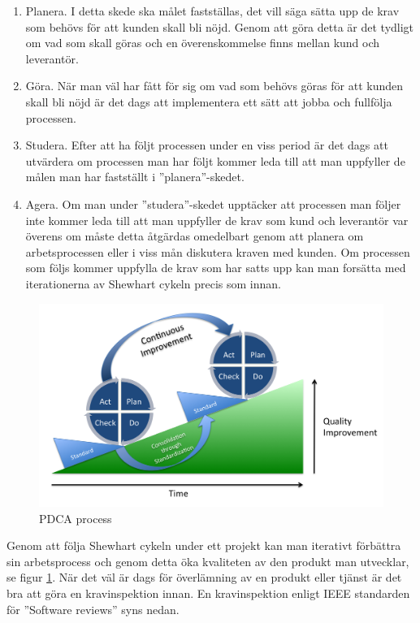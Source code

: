 \begin{enumerate}
  \item Planera. I detta skede ska målet fastställas, det vill säga sätta upp de krav som behövs för att kunden skall bli nöjd. Genom att göra detta är det tydligt om vad som skall göras och en överenskommelse finns mellan kund och leverantör. 
  \item Göra. När man väl har fått för sig om vad som behövs göras för att kunden skall bli nöjd är det dags att implementera ett sätt att jobba och fullfölja processen.
  \item Studera. Efter att ha följt processen under en viss period är det dags att utvärdera om processen man har följt kommer leda till att man uppfyller de målen man har fastställt i ''planera''-skedet.
  \item Agera. Om man under ''studera''-skedet upptäcker att processen man följer inte kommer leda till att man uppfyller de krav som kund och leverantör var överens om måste detta åtgärdas omedelbart genom att planera om arbetsprocessen eller i viss mån diskutera kraven med kunden. Om processen som följs kommer uppfylla de krav som har satts upp kan man forsätta med iterationerna av Shewhart cykeln precis som innan.
\end{enumerate}
\begin{figure}[h]
\centerline{\includegraphics[scale=0.15]{ruben-tex/graphic/PDCA_Process}}
\caption{PDCA process}
\label{fig:pdcaprocess}
\end{figure}
\noindent Genom att följa Shewhart cykeln under ett projekt kan man iterativt förbättra sin arbetsprocess och genom detta öka kvaliteten av den produkt man utvecklar, se figur \ref{fig:pdcaprocess}.
\newline
\newline
När det väl är dags för överlämning av en produkt eller tjänst är det bra att göra en kravinspektion innan. En kravinspektion enligt IEEE standarden för ''Software reviews'' syns nedan.


